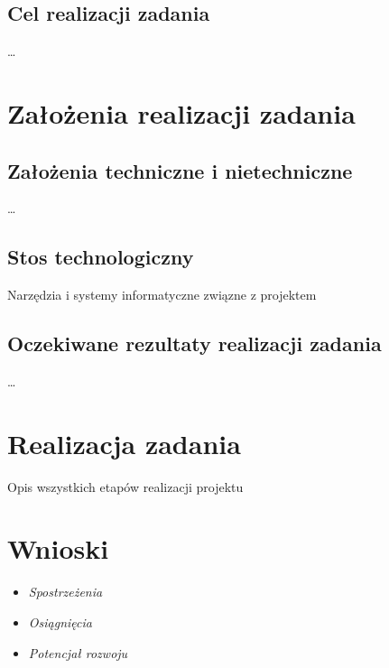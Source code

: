 \documentclass[12pt,a4paper]{article}
\begin{document}
\subsection{Cel realizacji zadania}
\ldots 

\newpage

\section{Założenia realizacji zadania}

\subsection{Założenia techniczne i nietechniczne}
\ldots 

\subsection{Stos technologiczny}
Narzędzia i systemy informatyczne związne z projektem

\subsection{Oczekiwane rezultaty realizacji zadania}
\ldots 

\newpage
\section{Realizacja zadania}
Opis wszystkich etapów realizacji projektu

\newpage
\section{Wnioski}

\begin{itemize}
\item \textit{Spostrzeżenia}
\item \textit{Osiągnięcia}
\item \textit{Potencjał rozwoju}
\end{itemize}
\end{document}
